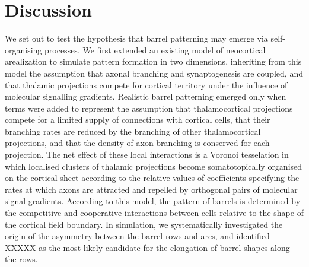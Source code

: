 \documentclass[a4paper,11pt]{article}
\begin{document}
\section*{Discussion}

We set out to test the hypothesis that barrel patterning may emerge via
self-organising processes. We first extended an existing model of neocortical
arealization to simulate pattern formation in two dimensions, inheriting from
this model the assumption that axonal branching and synaptogenesis are
coupled, and that thalamic projections compete for cortical territory under
the influence of molecular signalling gradients. Realistic barrel patterning
emerged only when terms were added to represent the assumption that
thalamocortical projections compete for a limited supply of connections with
cortical cells, that their branching rates are reduced by the branching of
other thalamocortical projections, and that the density of axon branching is
conserved for each projection. The net effect of these local interactions is a
Voronoi tesselation in which localised clusters of thalamic projections become
somatotopically organised on the cortical sheet according to the relative
values of coefficients specifying the rates at which axons are attracted and
repelled by orthogonal pairs of molecular signal gradients. According to this
model, the pattern of barrels is determined by the competitive and cooperative
interactions between cells relative to the shape of the cortical field
boundary. In simulation, we systematically investigated the origin of the
asymmetry between the barrel rows and arcs, and identified {\color{red} XXXXX}
as the most likely candidate for the elongation of barrel shapes along the
rows.



\end{document}
